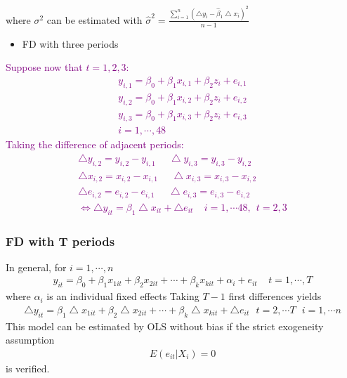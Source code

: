 \documentclass[a4paper,twoside,11pt]{article}
\begin{document}
where $\sigma^2$ can be estimated with $\hat{\sigma}^2 = \frac{\sum^n_{i=1} (\bigtriangleup y_i - \hat{\beta}_1 \bigtriangleup x_i )^2}{n-1}$
\begin{itemize}
    \item FD with three periods
\end{itemize}
\textcolor{Purple}{
Suppose now that $t=1,2,3:$
\begin{equation*}
\begin{aligned}
y_{i,1} = \beta_0 + \beta_1 x_{i,1} + \beta_2 z_i + e_{i,1} \\
y_{i,2} = \beta_0 + \beta_1 x_{i,2} + \beta_2 z_i + e_{i,2} \\
y_{i,3} = \beta_0 + \beta_1 x_{i,3} + \beta_2 z_i + e_{i,3} \\
i = 1, \cdots, 48
\end{aligned}
\end{equation*}
Taking the difference of adjacent periods:
\begin{equation*}
\begin{aligned}
\bigtriangleup y_{i,2} = y_{i,2} - y_{i,1} \ \ \ \ \ \ \bigtriangleup y_{i,3} = y_{i,3} - y_{i,2} \\
\bigtriangleup x_{i,2} = x_{i,2} - x_{i,1} \ \ \ \ \ \ \bigtriangleup x_{i,3} = x_{i,3} - x_{i,2} \\
\bigtriangleup e_{i,2} = e_{i,2} - e_{i,1} \ \ \ \ \ \ \bigtriangleup e_{i,3} = e_{i,3} - e_{i,2} \\
\Leftrightarrow \bigtriangleup y_{it} = \beta_1 \bigtriangleup x_{it} + \bigtriangleup e_{it} \ \ \ \ \ i = 1,\cdots 48 , \ \ t = 2,3
\end{aligned}
\end{equation*}
}
\subsubsection{FD with T periods}
\begin{shaded*}
\noindent In general, for $i=1,\cdots , n$
\begin{equation*}
\begin{aligned}
y_{it} = \beta_0 + \beta_1 x_{1it} + \beta_2 x_{2it} + \cdots + \beta_k x_{kit} + \alpha_i + e_{it} \ \ \ \ \ t = 1,\cdots , T
\end{aligned}
\end{equation*}
where $\alpha_i$ is an individual fixed effects
\newline
\newline
Taking $T-1$ first differences yields
\begin{equation*}
\begin{aligned}
\bigtriangleup y_{it} = \beta_1 \bigtriangleup x_{1it} + \beta_2 \bigtriangleup x_{2it} + \cdots + \beta_k \bigtriangleup x_{kit} + \bigtriangleup e_{it} \ \ \ t=2,\cdots T \ \ \ i=1,\cdots n
\end{aligned}
\end{equation*}
This model can be estimated by OLS without bias if the strict exogeneity assumption
\begin{equation*}
\begin{aligned}
E(e_{it}|X_i)= 0 
\end{aligned}
\end{equation*}
is verified.
\end{shaded*}
\end{document}
